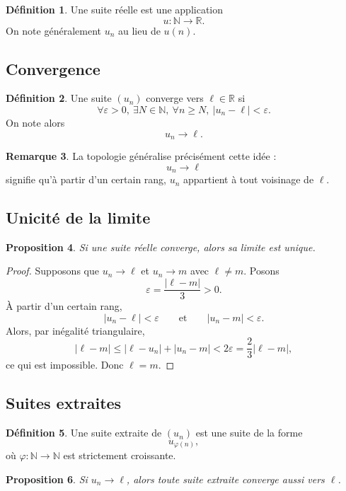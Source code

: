 \documentclass[11pt,a4paper]{article}
\theoremstyle{definition}
\newtheorem{definition}{Définition}[section]
\newtheorem{remarque}[definition]{Remarque}
\theoremstyle{plain}
\newtheorem{proposition}[definition]{Proposition}
\newcommand{\R}{\mathbb{R}}
\newcommand{\N}{\mathbb{N}}
\newcommand{\eps}{\varepsilon}
\begin{document}
\begin{definition}
Une suite réelle est une application
\[
u:\N\to\R.
\]
On note généralement $u_n$ au lieu de $u(n)$.
\end{definition}

\subsection{Convergence}

\begin{definition}
Une suite $(u_n)$ converge vers $\ell\in\R$ si
\[
\forall \eps>0,\ \exists N\in\N,\ \forall n\geq N,\ |u_n-\ell|<\eps.
\]
On note alors
\[
u_n\longrightarrow \ell.
\]
\end{definition}

\begin{remarque}
La topologie généralise précisément cette idée :
\[
u_n\to \ell
\]
signifie qu'à partir d'un certain rang, $u_n$ appartient à tout voisinage de $\ell$.
\end{remarque}

\subsection{Unicité de la limite}

\begin{proposition}
Si une suite réelle converge, alors sa limite est unique.
\end{proposition}

\begin{proof}
Supposons que $u_n\to \ell$ et $u_n\to m$ avec $\ell\neq m$.
Posons
\[
\eps=\frac{|\ell-m|}{3}>0.
\]
À partir d'un certain rang,
\[
|u_n-\ell|<\eps
\qquad\text{et}\qquad
|u_n-m|<\eps.
\]
Alors, par inégalité triangulaire,
\[
|\ell-m|
\leq |\ell-u_n|+|u_n-m|
<2\eps
=
\frac{2}{3}|\ell-m|,
\]
ce qui est impossible. Donc $\ell=m$.
\end{proof}

\subsection{Suites extraites}

\begin{definition}
Une suite extraite de $(u_n)$ est une suite de la forme
\[
u_{\varphi(n)},
\]
où $\varphi:\N\to\N$ est strictement croissante.
\end{definition}

\begin{proposition}
Si $u_n\to \ell$, alors toute suite extraite converge aussi vers $\ell$.
\end{proposition}
\end{document}
